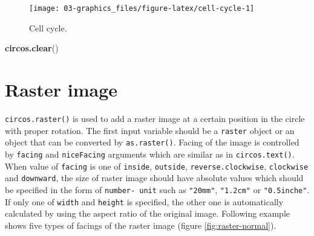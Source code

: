 \documentclass[]{book}
\newenvironment{Shaded}{\begin{snugshade}}{\end{snugshade}}
\newcommand{\KeywordTok}[1]{\textcolor[rgb]{0.13,0.29,0.53}{\textbf{#1}}}
\newcommand{\NormalTok}[1]{#1}
\theoremstyle{definition}
\theoremstyle{definition}
\theoremstyle{remark}
\begin{document}
\begin{figure}

{\centering \texttt{[image: 03-graphics\_files/figure-latex/cell-cycle-1]} 

}

\caption{Cell cycle.}\label{fig:cell-cycle}
\end{figure}

\begin{Shaded}
\begin{Highlighting}[]
\KeywordTok{circos.clear}\NormalTok{()}
\end{Highlighting}
\end{Shaded}

\section{Raster image}\label{raster-image}

\texttt{circos.raster()} is used to add a raster image at a certain
position in the circle with proper rotation. The first input variable
should be a \texttt{raster} object or an object that can be converted by
\texttt{as.raster()}. Facing of the image is controlled by
\texttt{facing} and \texttt{niceFacing} arguments which are similar as
in \texttt{circos.text()}. When value of \texttt{facing} is one of
\texttt{inside}, \texttt{outside}, \texttt{reverse.clockwise},
\texttt{clockwise} and \texttt{downward}, the size of raster image
should have absolute values which should be specified in the form of
\texttt{number-\ unit} such as \texttt{"20mm"}, \texttt{"1.2cm"} or
\texttt{"0.5inche"}. If only one of \texttt{width} and \texttt{height}
is specified, the other one is automatically calculated by using the
aspect ratio of the original image. Following example shows five types
of facings of the raster image (figure \ref{fig:raster-normal}).
\end{document}
